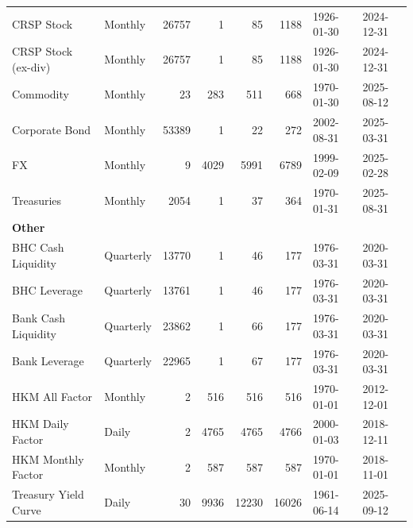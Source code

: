 \begin{tabular}{@{}llrrrrll@{}}
CRSP Stock & Monthly & 26757 & 1 & 85 & 1188 & 1926-01-30 & 2024-12-31 \\
CRSP Stock (ex-div) & Monthly & 26757 & 1 & 85 & 1188 & 1926-01-30 & 2024-12-31 \\
Commodity & Monthly & 23 & 283 & 511 & 668 & 1970-01-30 & 2025-08-12 \\
Corporate Bond & Monthly & 53389 & 1 & 22 & 272 & 2002-08-31 & 2025-03-31 \\
FX & Monthly & 9 & 4029 & 5991 & 6789 & 1999-02-09 & 2025-02-28 \\
Treasuries & Monthly & 2054 & 1 & 37 & 364 & 1970-01-31 & 2025-08-31 \\
\midrule
\multicolumn{8}{l}{\textbf{Other}} \\
BHC Cash Liquidity & Quarterly & 13770 & 1 & 46 & 177 & 1976-03-31 & 2020-03-31 \\
BHC Leverage & Quarterly & 13761 & 1 & 46 & 177 & 1976-03-31 & 2020-03-31 \\
Bank Cash Liquidity & Quarterly & 23862 & 1 & 66 & 177 & 1976-03-31 & 2020-03-31 \\
Bank Leverage & Quarterly & 22965 & 1 & 67 & 177 & 1976-03-31 & 2020-03-31 \\
HKM All Factor & Monthly & 2 & 516 & 516 & 516 & 1970-01-01 & 2012-12-01 \\
HKM Daily Factor & Daily & 2 & 4765 & 4765 & 4766 & 2000-01-03 & 2018-12-11 \\
HKM Monthly Factor & Monthly & 2 & 587 & 587 & 587 & 1970-01-01 & 2018-11-01 \\
Treasury Yield Curve & Daily & 30 & 9936 & 12230 & 16026 & 1961-06-14 & 2025-09-12 \\
\bottomrule
\end{tabular}